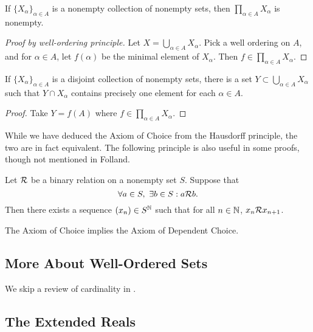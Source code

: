 \documentclass[12pt]{article} %
\begin{document}
\begin{principle}
    If $\{X_\alpha\}_{\alpha \in A}$ is a nonempty collection of nonempty sets, then $\prod_{\alpha \in A} X_\alpha$ is nonempty.
\end{principle}

\begin{proof}[Proof by well-ordering principle]
    Let $X = \bigcup_{\alpha \in A} X_\alpha$. Pick a well ordering on $A$, and for $\alpha \in A$, let $f(\alpha)$ be the minimal element of $X_\alpha$. Then $f \in \prod_{\alpha \in A} X_\alpha$.
\end{proof}

\begin{corollary}
    If $\{X_\alpha\}_{\alpha \in A}$ is a disjoint collection of nonempty sets, there is a set $Y \subset \bigcup_{\alpha \in A} X_\alpha$ such that $Y \cap X_\alpha$ contains precisely one element for each $\alpha \in A$.
\end{corollary}

\begin{proof}
    Take $Y = f(A)$ where $f \in \prod_{\alpha \in A} X_\alpha$.
\end{proof}

\noindent While we have deduced the Axiom of Choice from the Hausdorff principle, the two are in fact equivalent. The following principle is also useful in some proofs, though not mentioned in Folland.

\begin{principle}
    Let $\mathcal{R}$ be a binary relation on a nonempty set $S$. Suppose that \[\forall a \in S, \ \exists b \in S : a \mathcal{R} b.\] Then there exists a sequence $(x_n) \in S^{\mathbb{N}}$ such that for all $n \in \mathbb{N}$, $x_n \mathcal{R} x_{n+1}$.
\end{principle}

\begin{proposition}
    The Axiom of Choice implies the Axiom of Dependent Choice.
\end{proposition}

\subsection{More About Well-Ordered Sets}

We skip a review of cardinality in \citet{folland1999real}.

\subsection{The Extended Reals}
\end{document}
